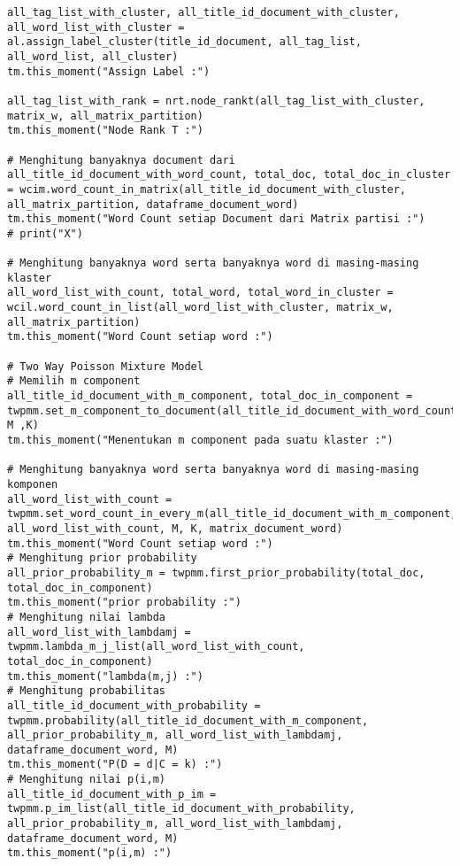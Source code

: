 \begin{lstlisting}[breaklines=true]
all_tag_list_with_cluster, all_title_id_document_with_cluster, all_word_list_with_cluster = al.assign_label_cluster(title_id_document, all_tag_list, all_word_list, all_cluster)
tm.this_moment("Assign Label :")

all_tag_list_with_rank = nrt.node_rankt(all_tag_list_with_cluster, matrix_w, all_matrix_partition)
tm.this_moment("Node Rank T :")

# Menghitung banyaknya document dari 
all_title_id_document_with_word_count, total_doc, total_doc_in_cluster = wcim.word_count_in_matrix(all_title_id_document_with_cluster, all_matrix_partition, dataframe_document_word)
tm.this_moment("Word Count setiap Document dari Matrix partisi :")
# print("X")

# Menghitung banyaknya word serta banyaknya word di masing-masing klaster
all_word_list_with_count, total_word, total_word_in_cluster = wcil.word_count_in_list(all_word_list_with_cluster, matrix_w, all_matrix_partition)
tm.this_moment("Word Count setiap word :")

# Two Way Poisson Mixture Model
# Memilih m component
all_title_id_document_with_m_component, total_doc_in_component = twpmm.set_m_component_to_document(all_title_id_document_with_word_count, M ,K)
tm.this_moment("Menentukan m component pada suatu klaster :")

# Menghitung banyaknya word serta banyaknya word di masing-masing komponen
all_word_list_with_count = twpmm.set_word_count_in_every_m(all_title_id_document_with_m_component, all_word_list_with_count, M, K, matrix_document_word)
tm.this_moment("Word Count setiap word :")
# Menghitung prior probability
all_prior_probability_m = twpmm.first_prior_probability(total_doc, total_doc_in_component)
tm.this_moment("prior probability :")
# Menghitung nilai lambda
all_word_list_with_lambdamj = twpmm.lambda_m_j_list(all_word_list_with_count, total_doc_in_component)
tm.this_moment("lambda(m,j) :")
# Menghitung probabilitas
all_title_id_document_with_probability = twpmm.probability(all_title_id_document_with_m_component, all_prior_probability_m, all_word_list_with_lambdamj, dataframe_document_word, M)
tm.this_moment("P(D = d|C = k) :")
# Menghitung nilai p(i,m)
all_title_id_document_with_p_im = twpmm.p_im_list(all_title_id_document_with_probability, all_prior_probability_m, all_word_list_with_lambdamj, dataframe_document_word, M)
tm.this_moment("p(i,m) :")


\end{lstlisting}
